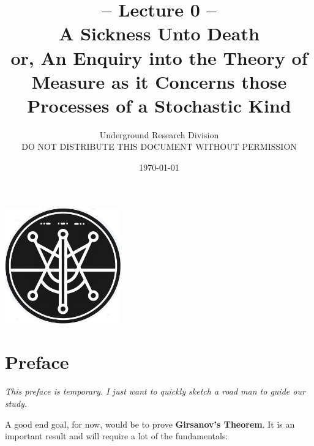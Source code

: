 \documentclass[reqno,a4paper,12pt]{amsart}%
\numberwithin{equation}{section}
\theoremstyle{definition}
\begin{document}
	\title[A Sickness Unto Death]{-- Lecture  0 -- \\
	\Large A Sickness Unto Death \\
	\small or, An Enquiry into the Theory of Measure as it Concerns those Processes of a Stochastic Kind
	}
	\author[Underground Research Division]{Underground Research Division
	\\ 
	DO NOT DISTRIBUTE THIS DOCUMENT WITHOUT PERMISSION }
	\date{\today}
	\maketitle
	
	\begin{center}
		\includegraphics[width=5cm, height=5cm]{urd.jpg}
	 \end{center}
	
\pagebreak

\section*{Preface}

\textit{This preface is temporary. I just want to quickly sketch a road man to guide our study.}

\smallbreak

A good end goal, for now, would be to prove \textbf{Girsanov's Theorem}. It is an important result and will require a lot of the fundamentals:

\smallbreak
\end{document}
